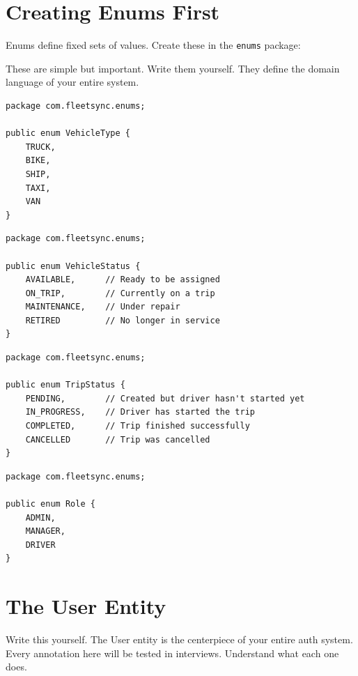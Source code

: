\documentclass[12pt,a4paper]{report}
\newcommand{\code}[1]{\texttt{\textcolor{keywordblue}{#1}}}
\begin{document}
\section{Creating Enums First}

Enums define fixed sets of values. Create these in the \code{enums} package:

\begin{tcolorbox}[handbox]
These are simple but important. Write them yourself. They define the domain language of your entire system.
\end{tcolorbox}

\begin{lstlisting}[caption=VehicleType.java]
package com.fleetsync.enums;

public enum VehicleType {
    TRUCK,
    BIKE,
    SHIP,
    TAXI,
    VAN
}
\end{lstlisting}

\begin{lstlisting}[caption=VehicleStatus.java]
package com.fleetsync.enums;

public enum VehicleStatus {
    AVAILABLE,      // Ready to be assigned
    ON_TRIP,        // Currently on a trip
    MAINTENANCE,    // Under repair
    RETIRED         // No longer in service
}
\end{lstlisting}

\begin{lstlisting}[caption=TripStatus.java]
package com.fleetsync.enums;

public enum TripStatus {
    PENDING,        // Created but driver hasn't started yet
    IN_PROGRESS,    // Driver has started the trip
    COMPLETED,      // Trip finished successfully
    CANCELLED       // Trip was cancelled
}
\end{lstlisting}

\begin{lstlisting}[caption=Role.java]
package com.fleetsync.enums;

public enum Role {
    ADMIN,
    MANAGER,
    DRIVER
}
\end{lstlisting}

\section{The User Entity}

\begin{tcolorbox}[handbox]
Write this yourself. The User entity is the centerpiece of your entire auth system. Every annotation here will be tested in interviews. Understand what each one does.
\end{tcolorbox}
\end{document}
